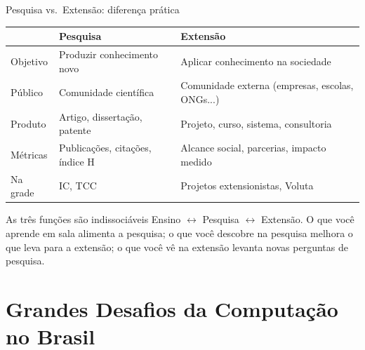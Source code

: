 \documentclass[aspectratio=169]{beamer}
\begin{document}
\begin{frame}{Pesquisa vs.\ Extensão: diferença prática}
  \footnotesize
  \centering
  \renewcommand{\arraystretch}{1.4}
  \begin{tabular}{lp{5cm}p{5cm}}
    \toprule
    & \textbf{Pesquisa} & \textbf{Extensão} \\
    \midrule
    Objetivo     & Produzir conhecimento novo & Aplicar conhecimento na sociedade \\
    Público      & Comunidade científica & Comunidade externa (empresas, escolas, ONGs...) \\
    Produto      & Artigo, dissertação, patente & Projeto, curso, sistema, consultoria \\
    Métricas     & Publicações, citações, índice H & Alcance social, parcerias, impacto medido \\
    Na grade     & IC, TCC & Projetos extensionistas, Voluta \\
    \bottomrule
  \end{tabular}
  \pause
  \begin{block}{As três funções são indissociáveis}
    Ensino $\leftrightarrow$ Pesquisa $\leftrightarrow$ Extensão. O que você aprende em sala alimenta a pesquisa; o que você descobre na pesquisa melhora o que leva para a extensão; o que você vê na extensão levanta novas perguntas de pesquisa.
  \end{block}
\end{frame}

\section{Grandes Desafios da Computação no Brasil}
\end{document}

